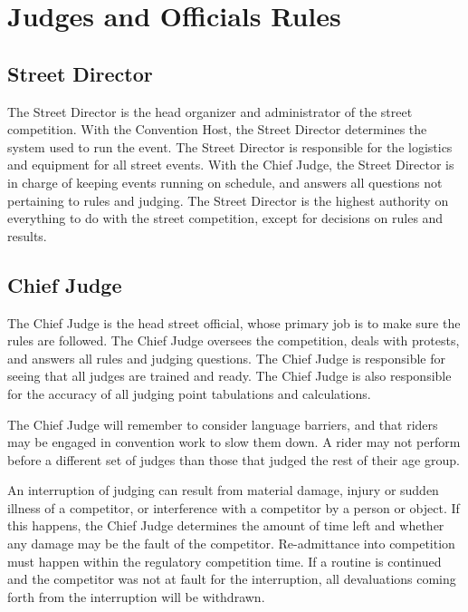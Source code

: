 \chapter{Judges and Officials Rules}

\section{Street Director}

The Street Director is the head organizer and administrator of the street competition.
With the Convention Host, the Street Director determines the system used to run the event.
The Street Director is responsible for the logistics and equipment for all street events.
With the Chief Judge, the Street Director is in charge of keeping events running on schedule, and answers all questions not pertaining to rules and judging.
The Street Director is the highest authority on everything to do with the street competition, except for decisions on rules and results.

\section{Chief Judge}

The Chief Judge is the head street official, whose primary job is to make sure the rules are followed.
The Chief Judge oversees the competition, deals with protests, and answers all rules and judging questions.
The Chief Judge is responsible for seeing that all judges are trained and ready.
The Chief Judge is also responsible for the accuracy of all judging point tabulations and calculations.

The Chief Judge will remember to consider language barriers, and that riders may be engaged in convention work to slow them down.
A rider may not perform before a different set of judges than those that judged the rest of their age group.

An interruption of judging can result from material damage, injury or sudden illness of a competitor, or interference with a competitor by a person or object.
If this happens, the Chief Judge determines the amount of time left and whether any damage may be the fault of the competitor.
Re-admittance into competition must happen within the regulatory competition time.
If a routine is continued and the competitor was not at fault for the interruption, all devaluations coming forth from the interruption will be withdrawn.

